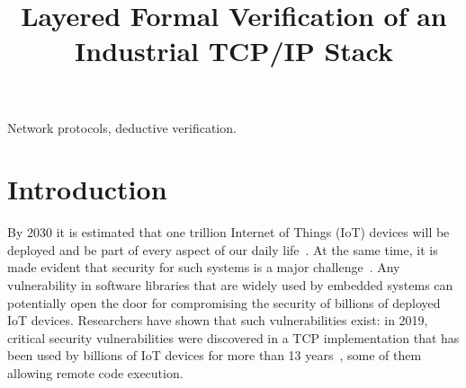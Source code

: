 \documentclass[conference]{IEEEtran}
\begin{document}
\title{Layered Formal Verification of an Industrial TCP/IP Stack}

\author{%
\and
{}
\and
{}
\and
{}
}

\maketitle

\begin{abstract}
\end{abstract}

\begin{IEEEkeywords}
Network protocols,
deductive verification.
\end{IEEEkeywords}

\section{Introduction}

By 2030 it is estimated that one trillion Internet of Things (IoT) devices will be deployed and be part of every aspect of our daily life~\cite{IoT_route:ARM_white_paper}. At the same time, it is made evident that security for such systems is a major challenge~\cite{Sec_IoT_Challenges:paper,Cyber_Systems_security:paper}. Any vulnerability in software libraries that are widely used by embedded systems can potentially open the door for compromising the security of billions of deployed IoT devices. Researchers have shown that such vulnerabilities exist: in 2019, critical security vulnerabilities were discovered in a TCP implementation that has been used by billions of IoT devices for more than 13 years~\cite{zero_days_vuln:ARMIS_white_paper}, some of them allowing remote code execution.
\end{document}
